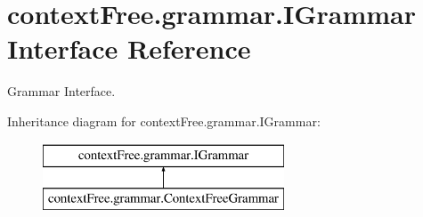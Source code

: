 \hypertarget{interfacecontext_free_1_1grammar_1_1_i_grammar}{\section{context\-Free.\-grammar.\-I\-Grammar Interface Reference}
\label{interfacecontext_free_1_1grammar_1_1_i_grammar}
}


Grammar Interface.  


Inheritance diagram for context\-Free.\-grammar.\-I\-Grammar\-:\begin{figure}[H]
\begin{center}
\leavevmode
\includegraphics[height=2.000000cm]{interfacecontext_free_1_1grammar_1_1_i_grammar}
\end{center}
\end{figure}
